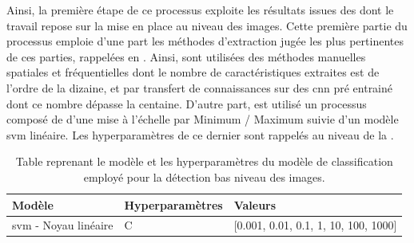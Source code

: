 Ainsi, la première étape de ce processus exploite les résultats issues des  dont le travail repose sur la mise en place  au niveau des images. Cette première partie du processus emploie d'une part les méthodes d'extraction jugée les plus pertinentes de ces parties, rappelées en . Ainsi, sont utilisées des méthodes manuelles spatiales et fréquentielles dont le nombre de caractéristiques extraites est de l'ordre de la dizaine, et par transfert de connaissances sur des \gls{cnn} pré entrainé dont ce nombre dépasse la centaine. D'autre part, est utilisé un processus composé de d'une mise à l'échelle par Minimum / Maximum suivie d'un modèle \gls{svm} linéaire. Les hyperparamètres de ce dernier sont rappelés au niveau de la    .\par

\begin{table}[H]
    \centering
    \begin{tabular}{lll}
        \toprule
        \textbf{Modèle}                                 & \textbf{Hyperparamètres}  & \textbf{Valeurs}                          \\ \midrule
        \gls{svm} - Noyau linéaire                      & C                         & [0.001, 0.01, 0.1, 1, 10, 100, 1000]      \\ 
        \bottomrule 
    \end{tabular} 
    \caption{Table reprenant le modèle et les hyperparamètres du modèle de classification employé pour la détection bas niveau des images.}
    \label{tab:parameters_lesion_classification_image_supervised}
\end{table}\par

